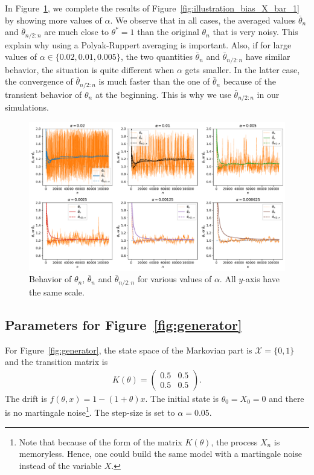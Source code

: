\documentclass{article}
\newcommand{\calX}{\mathcal{X}}
\begin{document}
In Figure~\ref{fig:more_trajs}, we complete the results of Figure~\ref{fig:illustration_bias_X_bar_1} by showing more values of $\alpha$. We observe that in all cases, the averaged values $\bar{\theta}_n$ and $\bar{\theta}_{n/2:n}$ are much close to $\theta^*=1$ than the original $\theta_n$ that is very noisy. This explain why using a Polyak-Ruppert averaging is important. Also, if for large values of $\alpha\in\{0.02,0.01,0.005\}$, the two quantities $\bar{\theta}_n$ and $\bar{\theta}_{n/2:n}$ have similar behavior, the situation is quite different when $\alpha$ gets smaller. In the latter case, the convergence of $\bar{\theta}_{n/2:n}$ is much faster than the one of $\bar{\theta}_{n}$ because of the transient behavior of $\theta_n$ at the beginning. This is why we use $\bar{\theta}_{n/2:n}$ in our simulations.
\begin{figure}[ht]
    \centering
    \includegraphics[width=\linewidth]{traj_SA_thetaBar_all.pdf}
    \caption{Behavior of $\theta_n$, $\bar{\theta}_n$ and $\bar{\theta}_{n/2:n}$ for various values of $\alpha$. All $y$-axis have the same scale. }
    \label{fig:more_trajs}
\end{figure}

\subsection{Parameters for Figure~\ref{fig:generator}}
\label{apx:additional_numerical_fig2}

For Figure~\ref{fig:generator},  the state space of the Markovian part is $\calX = \{0,1\}$ and the transition matrix is
\begin{align*}
    K(\theta) =
    \begin{pmatrix}
        0.5 & 0.5 \\
        0.5 & 0.5
    \end{pmatrix}.
\end{align*}
The drift is $f(\theta,x)=1 - (1+\theta)x$. The initial state is $\theta_0=X_0=0$ and there is no martingale noise\footnote{Note that because of the form of the matrix $K(\theta)$, the process $X_n$ is memoryless. Hence, one could build the same model with a martingale noise instead of the variable $X$.}. The step-size is set to $\alpha=0.05$.
\end{document}
